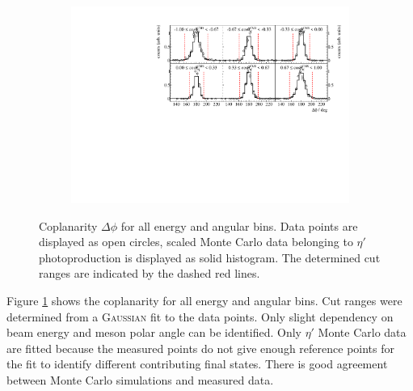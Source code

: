 \begin{figure}[H]
\ContinuedFloat
	\begin{subfigure}{\linewidth}
		\includegraphics[width=\linewidth]{../figs/hydrogen/bin_cuts/phicut_ebin3.pdf}
	\end{subfigure}
\caption{Coplanarity $\Delta\phi$ for all energy and angular bins. Data points are displayed as open circles, scaled Monte Carlo data belonging to $\eta'$ photoproduction is displayed as solid histogram. The determined cut ranges are indicated by the dashed red lines.}
\label{fig:appcopl}	
\end{figure}
Figure \ref{fig:appcopl} shows the coplanarity for all energy and angular bins. Cut ranges were determined from a \textsc{Gaussian} fit to the data points. Only slight dependency on beam energy and meson polar angle can be identified. Only $\eta'$ Monte Carlo data are fitted because the measured points do not give enough reference points for the fit to identify different contributing final states. There is good agreement between Monte Carlo simulations and measured data.
\newpage
